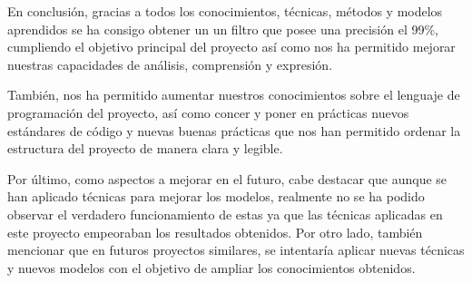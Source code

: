 \documentclass[conference,a4paper]{IEEEtran}
\begin{document}
En conclusión, gracias a todos los conocimientos, técnicas, métodos y modelos aprendidos se ha consigo obtener un un filtro que posee una precisión el 99\%, cumpliendo el objetivo principal del proyecto así como nos ha permitido mejorar nuestras capacidades de análisis, comprensión y expresión.

También, nos ha permitido aumentar nuestros conocimientos sobre el lenguaje de programación del proyecto, así como concer y poner en prácticas nuevos estándares de código y nuevas buenas prácticas que nos han permitido ordenar la estructura del proyecto de manera clara y legible.

Por último, como aspectos a mejorar en el futuro, cabe destacar que aunque se han aplicado técnicas para mejorar los modelos, realmente no se ha podido observar el verdadero funcionamiento de estas ya que las técnicas aplicadas en este proyecto empeoraban los resultados obtenidos. Por otro lado, también mencionar que en futuros proyectos similares, se intentaría aplicar nuevas técnicas y nuevos modelos con el objetivo de ampliar los conocimientos obtenidos.


\newpage
\end{document}

